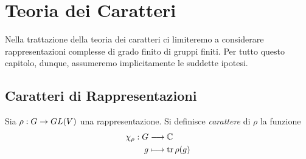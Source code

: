 \chapter{Teoria dei Caratteri}
Nella trattazione della teoria dei caratteri ci limiteremo a considerare rappresentazioni complesse di grado finito di gruppi finiti. Per tutto questo capitolo, dunque, assumeremo implicitamente le suddette ipotesi.

\section{Caratteri di Rappresentazioni}

\begin{definition}
Sia $\rho:G\to GL(V)$ una rappresentazione. Si definisce \emph{carattere} di $\rho$ la funzione
\begin{align*}
\chi_\rho:G&\longrightarrow\mathbb{C}\\
g&\longmapsto\operatorname{tr}\rho(g)
\end{align*}
\end{definition}


